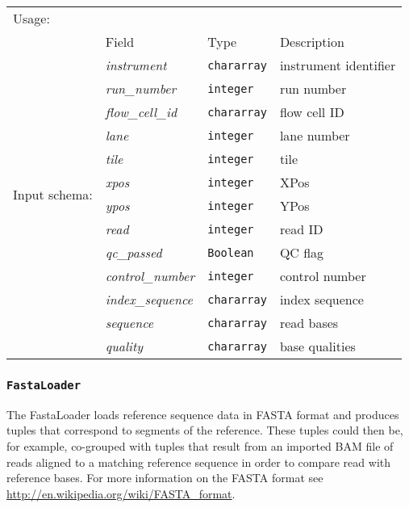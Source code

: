 \begin{tabular}{lp{}p{}p{}}
Usage: & \multicolumn{3}{l}{}
\hspace*{-0.55cm}\begin{minipage}{0.8\textwidth}
  \begin{lstlisting}
  store reads into 'output.fastq' using FastqStorer();
  \end{lstlisting}
  \end{minipage}\hfill\kern-\arrayrulewidth
 \\[0.25cm]
\multirow{14}{*}{Input schema:} & Field & Type & Description\\[0.1cm]
& \emph{instrument} & \texttt{chararray} & instrument identifier\\
& \emph{run\_number} & \texttt{integer} & run number\\
& \emph{flow\_cell\_id} & \texttt{chararray} & flow cell ID\\
& \emph{lane} & \texttt{integer} & lane number\\
& \emph{tile} & \texttt{integer} & tile\\
& \emph{xpos} & \texttt{integer} & XPos\\
& \emph{ypos} & \texttt{integer} & YPos\\
& \emph{read} & \texttt{integer} & read ID\\
& \emph{qc\_passed} & \texttt{Boolean} & QC flag\\
& \emph{control\_number} & \texttt{integer} & control number\\
& \emph{index\_sequence} & \texttt{chararray} & index sequence\\
& \emph{sequence} & \texttt{chararray} & read bases\\
& \emph{quality} & \texttt{chararray} & base qualities
\end{tabular}

\subsubsection{\texttt{FastaLoader}}

The FastaLoader loads reference sequence data in FASTA format and
produces tuples that correspond to segments of the reference. These
tuples could then be, for example, co-grouped with tuples that result
from an imported BAM file of reads aligned to a matching reference
sequence in order to compare read with reference bases. For more
information on the FASTA format see
\url{http://en.wikipedia.org/wiki/FASTA_format}.

